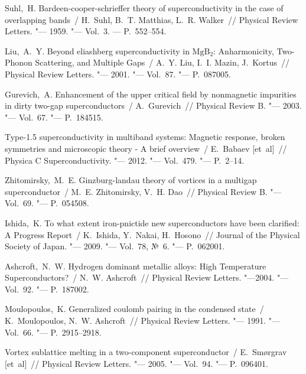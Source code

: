 \renewcommand{\bibname}{СПИСОК ИСПОЛЬЗОВАННЫХ ИСТОЧНИКОВ}

\begin{thebibliography}{10}
     Suhl,~H. Bardeen-cooper-schrieffer theory of
        superconductivity in the case of overlapping bands~/ H.~Suhl,
        B.~T. Matthias, L.~R. Walker~// Physical Review Letters. "---
        1959. "--- Vol.~3. --- P.~552--554.

     Liu,~A.~Y. Beyond eliashberg superconductivity in
        \( \mathrm{MgB_2} \): Anharmonicity, Two-Phonon Scattering, and
        Multiple Gaps~/ A.~Y. Liu, I.~I. Mazin, J.~Kortus~//
        Physical Review Letters. "--- 2001. "--- Vol.~87. "--- P.~087005.

     Gurevich,~A. Enhancement of the upper critical field by
        nonmagnetic impurities in dirty two-gap superconductors~/
        A.~Gurevich~// Physical Review B. "--- 2003. "--- Vol.~67. "---
        P.~184515.

     Type-1.5 superconductivity in multiband systems:
        Magnetic response, broken symmetries and microscopic theory -
        A brief overview~/ E.~{Babaev} [et~al]~//
        Physica C Superconductivity. "--- 2012. "--- Vol.~479. "---
        P.~2--14.

     Zhitomirsky,~M.~E. Ginzburg-landau theory of vortices in
        a multigap superconductor~/ M.~E. Zhitomirsky, V.~H. Dao~//
        Physical Review B. "--- Vol.~69. "--- P.~054508.

     Ishida,~K. To what extent iron-pnictide new
        superconductors have been clarified: A Progress Report~/
        K.~Ishida, Y.~Nakai, H.~Hosono~//
        Journal of the Physical Society of Japan. "--- 2009. "--- Vol.~78,
        №~6. "--- P.~062001.

     Ashcroft,~N.~W. Hydrogen dominant metallic alloys:
        High Temperature Superconductors?~/ N.~W. Ashcroft~//
        Physical Review Letters. "---2004. "--- Vol.~92. "--- P.~187002.

     Moulopoulos,~K. Generalized coulomb pairing in the
        condensed state~/ K.~Moulopoulos, N.~W. Ashcroft~//
        Physical Review Letters. "--- 1991. "--- Vol.~66. "--- P.~2915--2918.

     Vortex sublattice melting in a two-component
        superconductor~/ E.~Sm\o{}rgrav [et~al]~//
        Physical Review Letters. "--- 2005. "--- Vol.~94. "--- P.~096401.


\end{thebibliography}

